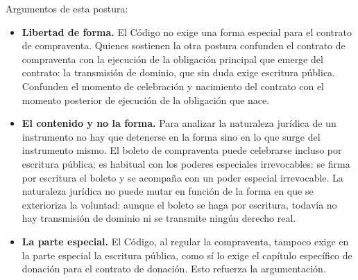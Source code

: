 \documentclass[12pt,oneside]{book}
\begin{document}
Argumentos de esta postura:
\begin{itemize}
    \item \textbf{Libertad de forma.} El Código no exige una forma especial para el contrato de compraventa. Quienes sostienen la otra postura confunden el contrato de compraventa con la ejecución de la obligación principal que emerge del contrato: la transmisión de dominio, que sin duda exige escritura pública. Confunden el momento de celebración y nacimiento del contrato con el momento posterior de ejecución de la obligación que nace.
    \item \textbf{El contenido y no la forma.} Para analizar la naturaleza jurídica de un instrumento no hay que detenerse en la forma sino en lo que surge del instrumento mismo. El boleto de compraventa puede celebrarse incluso por escritura pública; es habitual con los poderes especiales irrevocables: se firma por escritura el boleto y se acompaña con un poder especial irrevocable. La naturaleza jurídica no puede mutar en función de la forma en que se exterioriza la voluntad: aunque el boleto se haga por escritura, todavía no hay transmisión de dominio ni se transmite ningún derecho real.
    \item \textbf{La parte especial.} El Código, al regular la compraventa, tampoco exige en la parte especial la escritura pública, como sí lo exige el capítulo específico de donación para el contrato de donación. Esto refuerza la argumentación.
\end{itemize}
\end{document}
